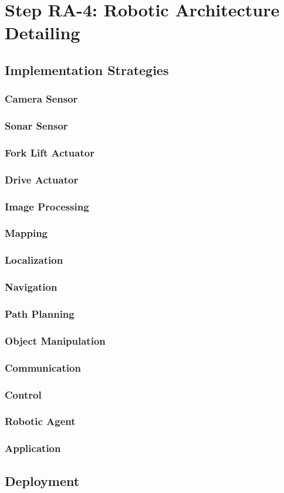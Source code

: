 \section{Step RA-4: Robotic Architecture Detailing}
\subsection{Implementation Strategies}
\subsubsection*{Camera Sensor}
\subsubsection*{Sonar Sensor}
\subsubsection*{Fork Lift Actuator}
\subsubsection*{Drive Actuator}
\subsubsection*{Image Processing}
\subsubsection*{Mapping}
\subsubsection*{Localization}
\subsubsection*{Navigation}
\subsubsection*{Path Planning}
\subsubsection*{Object Manipulation}
\subsubsection*{Communication}
\subsubsection*{Control}
\subsubsection*{Robotic Agent}
\subsubsection*{Application}

\subsection{Deployment}